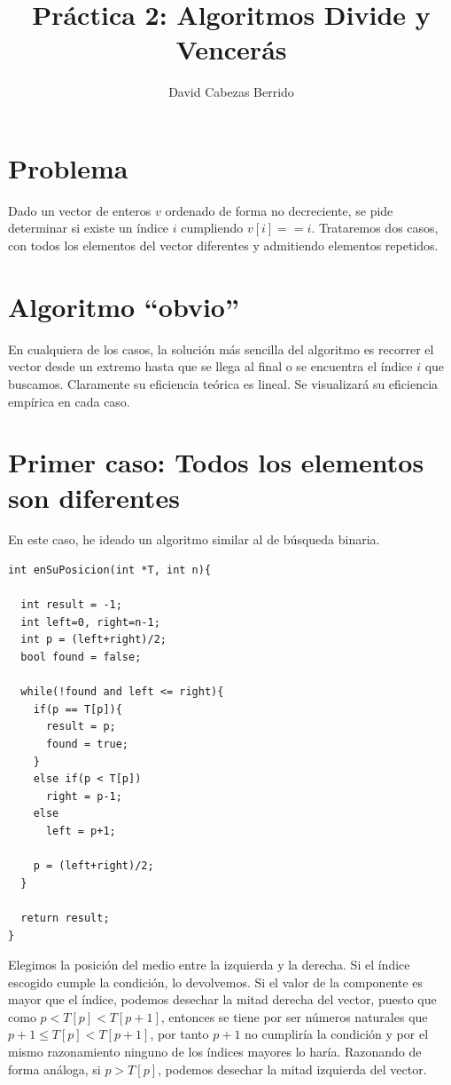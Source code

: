 \documentclass[a4]{article}
\author{David Cabezas Berrido}
\date{\vspace{-5mm}}
\title{\huge Práctica 2: Algoritmos Divide y Vencerás \HRule\vspace{-4mm}}
\begin{document}
\maketitle
\vspace{20mm}
\tableofcontents
\newpage

\section{Problema}
Dado un vector de enteros $v$ ordenado de forma no decreciente, se
pide determinar si existe un índice $i$ cumpliendo
$v[i]==i$. Trataremos dos casos, con todos los elementos del vector
diferentes y admitiendo elementos repetidos.

\section{Algoritmo ``obvio''}
En cualquiera de los casos, la solución más sencilla del algoritmo es
recorrer el vector desde un extremo hasta que se llega al final o se
encuentra el índice $i$ que buscamos. Claramente su eficiencia teórica
es lineal. Se visualizará su eficiencia empírica en cada caso.

\section{Primer caso: Todos los elementos son diferentes}
En este caso, he ideado un algoritmo similar al de búsqueda binaria.

\begin{lstlisting}
int enSuPosicion(int *T, int n){
  
  int result = -1;
  int left=0, right=n-1;
  int p = (left+right)/2;
  bool found = false;
  
  while(!found and left <= right){
    if(p == T[p]){
      result = p;
      found = true;
    }
    else if(p < T[p])
      right = p-1;
    else
      left = p+1;

    p = (left+right)/2;
  }

  return result;
}
\end{lstlisting}

Elegimos la posición del medio entre la izquierda y la derecha.  Si
el índice escogido cumple la condición, lo devolvemos. Si el valor
de la componente es mayor que el índice, podemos desechar la mitad
derecha del vector, puesto que como $p < T[p] < T[p+1]$, entonces se
tiene por ser números naturales que $p+1 \leq T[p] < T[p+1]$, por
tanto $p+1$ no cumpliría la condición y por el mismo razonamiento
ninguno de los índices mayores lo haría. Razonando de forma análoga,
si $p > T[p]$, podemos desechar la mitad izquierda del vector.
\end{document}
